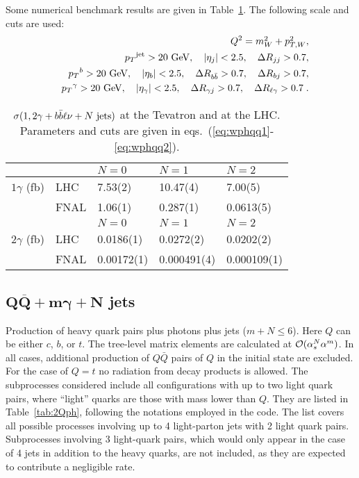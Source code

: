 \documentclass[paper]{JHEP3}
\newcommand{\gev}{\mbox{GeV}}
\newcommand{\ccaption}[2]{
    \begin{center}
    \parbox{0.85\textwidth}{
      \caption[#1]{\small{{#2}}}
      }
    \end{center}
    }
\def    \ba             {\begin{eqnarray}}
\def    \ea             {\end{eqnarray}}
\def    \gev            {\mbox{$\mathrm{GeV}$}}
\def    \bbar   {\bar{b}}
\def    \Qbar   {\overline{Q}}
\def    \mWsq             {\mbox{$m_W^2$} }
\def    \pt             {\mbox{$p_T$}}
\def    \ptWsq           {\mbox{$p^2_{T,W}$}}
\begin{document}
Some numerical benchmark results are given in
Table~\ref{tab:wphbbxs}. 
The following scale and cuts are used:
\ba \label{eq:wphqq1}
&& Q^2 = \mWsq + \ptWsq,
\\
        && \pt^{\rm jet}>20~\gev, \quad \vert \eta_j\vert < 2.5, \quad \Delta
        R_{jj} >0.7,
\\
        && \pt^{b}>20~\gev, \quad \vert \eta_b \vert < 2.5, \quad \Delta
        R_{b\bbar} >0.7, \quad \Delta R_{bj} >0.7,
\\
        && \pt^{\rm \gamma}>20~\gev, \quad \vert \eta_\gamma\vert 
< 2.5, \quad \Delta
        R_{\gamma j} >0.7, \quad \Delta
        R_{\ell \gamma} >0.7 \; .
\label{eq:wphqq2}
\ea
{\renewcommand{\arraystretch}{1.2}
\begin{table}
\begin{center}
\begin{tabular}{||l|l|l|l|l||}\hline
 & & $N = 0$  & 
$N = 1$ & $N = 2$ \\ 
\hline
$1\gamma$ (fb)  & LHC  & 7.53(2)  & 10.47(4)  & 7.00(5) \\ 
                & FNAL & 1.06(1)  & 0.287(1)  & 0.0613(5)\\
\hline
 & & $N = 0$  & 
$N = 1$ & $N = 2$ \\ 
\hline
$2\gamma$ (fb)  & LHC & 0.0186(1)  & 0.0272(2)  & 0.0202(2) \\ 
                & FNAL& 0.00172(1) & 0.000491(4)& 0.000109(1) \\
\hline
\hline
\end{tabular}
\ccaption{}{\label{tab:wphbbxs} $\sigma(1,2\gamma 
+ b \bbar \ell \nu + N~{\rm jets})$ at the Tevatron and
at the LHC. Parameters and cuts are given
in eqs.~(\ref{eq:wphqq1}-\ref{eq:wphqq2}). }
\end{center}
\end{table} }

\subsection{$\mathbf{ Q\Qbar + m \gamma + N}$ jets}
\label{sec:2Qph}
Production of heavy quark pairs plus photons plus jets ($m + N \leq 6$). 
Here $Q$ can be either $c$, $b$, or $t$. The tree-level matrix elements 
are calculated at ${\cal O}(\alpha_s^N \alpha^m)$. 
In all cases, 
additional production of $Q\bar{Q}$ pairs
of $Q$ in the initial state are excluded. For the case of $Q=t$ no 
radiation from decay products is allowed. 
The subprocesses considered include all configurations with up to two
light quark pairs, where ``light'' quarks are those with mass lower
than $Q$. They are listed in Table~\ref{tab:2Qph}, following 
the notations employed in the code. The list covers all possible 
processes involving up to 4 light-parton jets with 2 light quark pairs.
Subprocesses involving 3 light-quark pairs, which would only appear in
the case of 4 jets in addition to the heavy quarks, are not included,
as they are expected to contribute a negligible rate.
\end{document}
